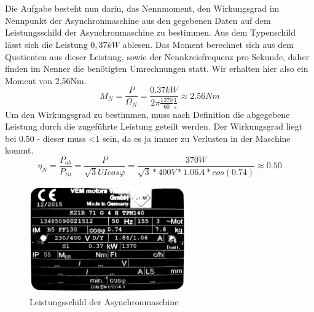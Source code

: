\section{}
Die Aufgabe besteht nun darin, das Nennmoment, den Wirkungsgrad im Nennpunkt der Asynchronmaschine aus den gegebenen Daten auf dem Leistungsschild der Asynchronmaschine zu bestimmen. Aus dem Typenschild lässt sich die Leistung $ 0,37kW $ ablesen. Das Moment berechnet sich aus dem Quotienten aus dieser Leistung, sowie der Nennkreisfrequenz pro Sekunde, daher finden im Nenner die benötigten Umrechnungen statt. Wir erhalten hier also ein Moment von 2,56Nm.
\begin{equation}
	M_{N} = \frac{P}{\Omega_{N}} = \frac{0.37kW}{2\pi\frac{1370}{60}\frac{1}{s}} \approx 2.56Nm
\end{equation}
Um den Wirkungsgrad zu bestimmen, muss nach Definition die abgegebene Leistung durch die zugeführte Leistung geteilt werden. Der Wirkungsgrad liegt bei 0.50 - dieser muss <1 sein, da es ja immer zu Verlusten in der Maschine kommt.
\begin{equation}
	\eta_{N} = \frac{P_{ab}}{P_{zu}} =  \frac{P}{\sqrt{3}UIcos\varphi} = \frac{370W}{\sqrt{3}*400V*1.06A*cos(0.74)} \approx 0.50
\end{equation}
\begin{figure}[h]
	\centering
	\includegraphics[width=0.6\textwidth]{./Bilder/Typenschild.png}
	\caption{Leistungsschild der Asynchronmaschine}
	\label{fig:4c:typenschild}
\end{figure}